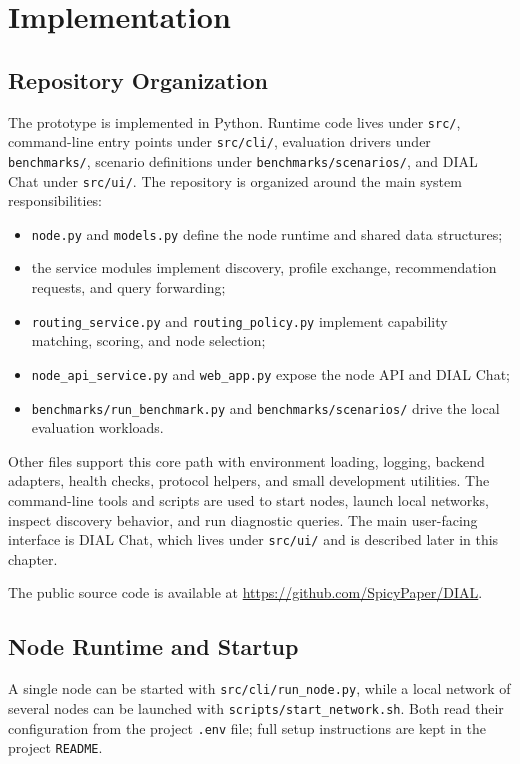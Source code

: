 \section{Implementation}

\subsection{Repository Organization}

The prototype is implemented in Python. Runtime code lives under
\texttt{src/}, command-line entry points under \texttt{src/cli/}, evaluation
drivers under \texttt{benchmarks/}, scenario definitions under
\texttt{benchmarks/scenarios/}, and DIAL Chat under \texttt{src/ui/}. The
repository is organized around the main system responsibilities:

\begin{itemize}
  \item \texttt{node.py} and \texttt{models.py} define the node runtime and
  shared data structures;
  \item the service modules implement discovery, profile exchange,
  recommendation requests, and query forwarding;
  \item \texttt{routing\_service.py} and \texttt{routing\_policy.py} implement
  capability matching, scoring, and node selection;
  \item \texttt{node\_api\_service.py} and \texttt{web\_app.py} expose the node
  API and DIAL Chat;
  \item \texttt{benchmarks/run\_benchmark.py} and
  \texttt{benchmarks/scenarios/} drive the local evaluation workloads.
\end{itemize}

Other files support this core path with environment loading, logging, backend
adapters, health checks, protocol helpers, and small development utilities.
The command-line tools and scripts are used to start nodes, launch local
networks, inspect discovery behavior, and run diagnostic queries. The main
user-facing interface is DIAL Chat, which lives under \texttt{src/ui/} and is
described later in this chapter.

The public source code is available at \url{https://github.com/SpicyPaper/DIAL}.

\subsection{Node Runtime and Startup}

A single node can be started with \texttt{src/cli/run\_node.py}, while a local
network of several nodes can be launched with
\texttt{scripts/start\_network.sh}. Both read their configuration from the
project \texttt{.env} file; full setup instructions are kept in the project
\texttt{README}.

